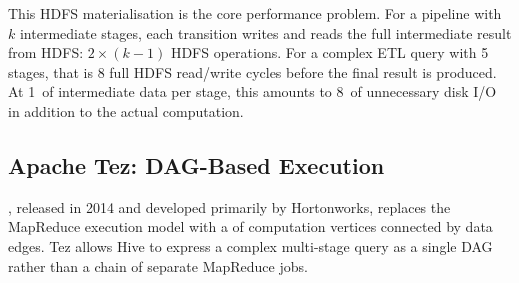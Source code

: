 This HDFS materialisation is the core performance problem. For a pipeline
with $k$ intermediate stages, each transition writes and reads the full
intermediate result from HDFS: $2 \times (k-1)$ HDFS operations. For a
complex ETL query with 5 stages, that is 8 full HDFS read/write cycles
before the final result is produced. At 1\TB\ of intermediate data per
stage, this amounts to 8\TB\ of unnecessary disk I/O in addition to the
actual computation.

\subsection{Apache Tez: DAG-Based Execution}
\label{subsec:tez}

, released in 2014 and developed primarily by Hortonworks,
replaces the MapReduce execution model with a  of computation vertices connected by data edges. Tez allows Hive
to express a complex multi-stage query as a single DAG rather than a chain
of separate MapReduce jobs.

